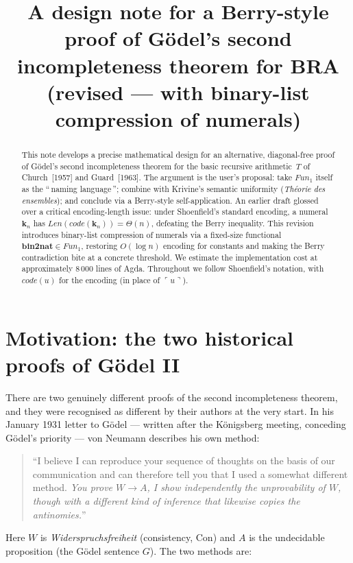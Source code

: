 \documentclass[11pt]{article}
\title{A design note for a Berry-style proof of G\"odel's second incompleteness theorem for BRA\\
\large{(revised --- with binary-list compression of numerals)}}
\author{}
\date{}
\theoremstyle{plain}
\theoremstyle{definition}
\theoremstyle{remark}
\newcommand{\code}[1]{\mathit{code}(#1)}
\newcommand{\Fun}{\mathit{Fun}}
\newcommand{\Len}{\mathit{Len}}
\newcommand{\bnt}{\mathbf{bin2nat}}
\begin{document}
\maketitle

\begin{abstract}
This note develops a precise mathematical design for an alternative,
diagonal-free proof of G\"odel's second incompleteness theorem for the
basic recursive arithmetic~$T$ of Church~[1957] and Guard~[1963].
The argument is the user's proposal: take $\Fun_1$ itself as the
``\,naming language\,''; combine with Krivine's semantic uniformity
({\it Th\'eorie des ensembles}); and conclude via a Berry-style
self-application.  An earlier draft glossed over a critical
encoding-length issue: under Shoenfield's standard encoding, a numeral
$\mathbf{k}_n$ has $\Len(\code{\mathbf{k}_n}) = \Theta(n)$, defeating
the Berry inequality.  This revision introduces binary-list
compression of numerals via a fixed-size functional
$\bnt \in \Fun_1$, restoring $O(\log n)$ encoding for constants and
making the Berry contradiction bite at a concrete threshold.  We
estimate the implementation cost at approximately
$8\,000$ lines of Agda.  Throughout we follow Shoenfield's notation,
with $\code{u}$ for the encoding (in place of $\ulcorner u \urcorner$).
\end{abstract}

\tableofcontents

\section{Motivation: the two historical proofs of G\"odel II}
\label{sec:motivation}

There are two genuinely different proofs of the second incompleteness
theorem, and they were recognised as different by their authors at the
very start.  In his January 1931 letter to G\"odel --- written after
the K\"onigsberg meeting, conceding G\"odel's priority --- von Neumann
describes his own method:

\begin{quote}
``I believe I can reproduce your sequence of thoughts on the basis of
our communication and can therefore tell you that I used a somewhat
different method.  \emph{You prove $W \to A$, I show independently the
unprovability of $W$, though with a different kind of inference that
likewise copies the antinomies.}''
\end{quote}

Here $W$ is \emph{Widerspruchsfreiheit} (consistency, $\mathrm{Con}$)
and $A$ is the undecidable proposition (the G\"odel sentence $G$).  The
two methods are:
\end{document}
